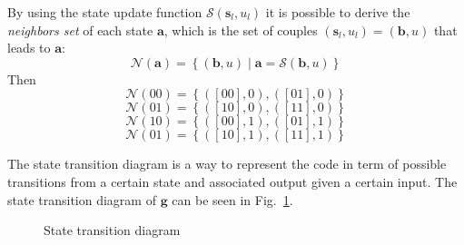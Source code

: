 \documentclass[10pt]{article}
\newcommand{\SU}[1] {\mathcal{S}(#1)}
\newcommand{\s} {\mathbf{s}}
\begin{document}

By using the state update function $\SU{\s_l, u_l}$ it is possible to derive the \emph{neighbors set} of each state $\mathbf{a}$, which is the set of couples $(\s_l, u_l) = (\mathbf{b}, u)$ that leads to $\mathbf{a}$:
\begin{equation}
	\mathcal{N}(\mathbf{a}) = \left\{ (\mathbf{b}, u) \middle| \mathbf{a} = \SU{\mathbf{b}, u} \right\} 
\end{equation}
Then
\begin{equation}
	\mathcal{N}(00) = \left\{ ([00], 0), ([01], 0) \right\} 
\end{equation}
\begin{equation*}
	\mathcal{N}(01) = \left\{ ([10], 0), ([11], 0) \right\} 
\end{equation*}
\begin{equation*}
	\mathcal{N}(10) = \left\{ ([00], 1), ([01], 1) \right\} 
\end{equation*}
\begin{equation*}
	\mathcal{N}(01) = \left\{ ([10], 1), ([11], 1) \right\} 
\end{equation*}

The state transition diagram is a way to represent the code in term of possible transitions from a certain state and associated output given a certain input. The state transition diagram of $\mathbf{g}$ can be seen in Fig.~\ref{fig:state}.

\begin{figure}
\centering
{}
\caption{State transition diagram}
\label{fig:state}
\end{figure}
\end{document}
